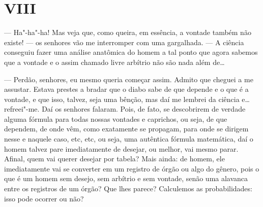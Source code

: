 \section{VIII}

--- Ha"-ha"-ha! Mas veja que, como queira, em essência, a vontade também não
existe! --- os senhores vão me interromper com uma gargalhada. --- A ciência
conseguiu fazer uma análise anatômica do homem a tal ponto que agora
sabemos que a vontade e o assim chamado livre arbítrio não são nada além
de\ldots{}

--- Perdão, senhores, eu mesmo queria começar assim. Admito que cheguei a
me assustar. Estava prestes a bradar que o diabo sabe de que depende e o
que é a vontade, e que isso, talvez, seja uma bênção, mas daí me lembrei
da ciência e\ldots{} refreei"-me. Daí os senhores falaram. Pois, de fato, se
descobrirem de verdade alguma fórmula para todas nossas vontades e
caprichos, ou seja, de que dependem, de onde vêm, como exatamente se
propagam, para onde se dirigem nesse e naquele caso, etc, etc, ou seja,
uma autêntica fórmula matemática, daí o homem talvez pare imediatamente
de desejar, ou melhor, vai mesmo parar. Afinal, quem vai querer desejar
por tabela? Mais ainda: de homem, ele imediatamente vai se converter em
um registro de órgão ou algo do gênero, pois o que é um homem sem
desejo, sem arbítrio e sem vontade, senão uma alavanca entre os
registros de um órgão? Que lhes parece? Calculemos as probabilidades:
isso pode ocorrer ou não?

